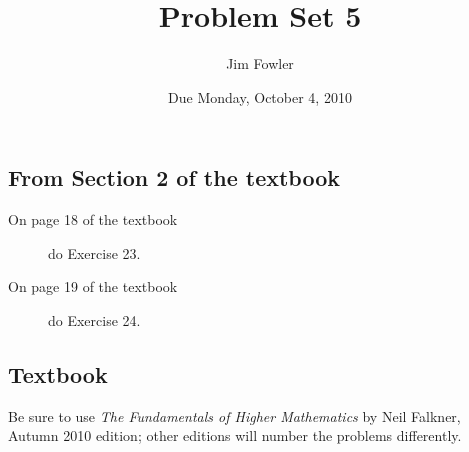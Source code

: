 \documentclass[12pt]{handout}
\author{Jim Fowler}
\title{Problem Set 5}
\date{Due Monday, October  4, 2010}
\begin{document}
\maketitle










\subsection*{From Section 2 of the textbook}



\begin{description}

\item[On page 18 of the textbook] do Exercise 23.

\item[On page 19 of the textbook] do Exercise 24.

\end{description}











\subsection*{Textbook}
Be sure to use \textit{The Fundamentals of Higher Mathematics} by Neil Falkner, Autumn 2010 edition; other editions will number the problems differently.
\end{document}
